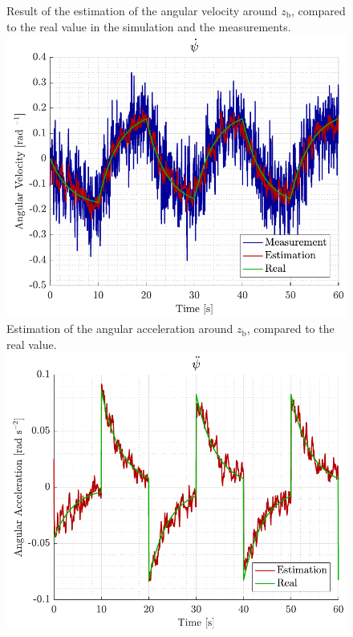 \begin{figure}[H]
    \captionbox 
    {   
        Result of the estimation of the angular velocity around $z_\mathrm{b}$, compared to the real value in the simulation and the measurements.
        \label{fig:sim_yawdot}
    }                                                                 
    {                                                                  
        \includegraphics[width=.45\textwidth]{figures/sim_yawdot}         
    }                                                                    
    \hspace{5pt}                                                          
    \captionbox  
    {      
        Estimation of the angular acceleration around $z_\mathrm{b}$, compared to the real value.
        \label{fig:sim_yawddot}
    }                                                                          
    {
        \includegraphics[width=.45\textwidth]{figures/sim_yawddot}
    }
\end{figure}
%
%
%
